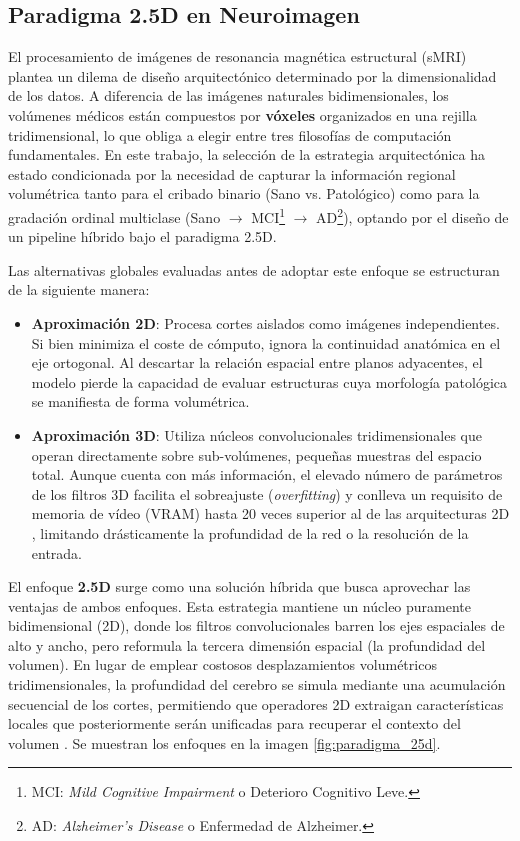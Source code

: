 \documentclass[12pt, oneside, english, spanish]{book}
\begin{document}
\subsection{Paradigma 2.5D en Neuroimagen} \label{subsec:paradigma_25d_teoria}

El procesamiento de imágenes de resonancia magnética estructural (sMRI) plantea un dilema de diseño arquitectónico determinado por la dimensionalidad de los datos. A diferencia de las imágenes naturales bidimensionales, los volúmenes médicos están compuestos por \textbf{vóxeles} organizados en una rejilla tridimensional, lo que obliga a elegir entre tres filosofías de computación fundamentales. En este trabajo, la selección de la estrategia arquitectónica ha estado condicionada por la necesidad de capturar la información regional volumétrica tanto para el cribado binario (Sano vs. Patológico) como para la gradación ordinal multiclase (Sano $\rightarrow$ MCI\footnote{MCI: \textit{Mild Cognitive Impairment} o Deterioro Cognitivo Leve.} $\rightarrow$ AD\footnote{AD: \textit{Alzheimer's Disease} o Enfermedad de Alzheimer.}), optando por el diseño de un pipeline híbrido bajo el paradigma 2.5D.

Las alternativas globales evaluadas antes de adoptar este enfoque se estructuran de la siguiente manera:

\begin{itemize}
	\item \textbf{Aproximación 2D}: Procesa cortes aislados como imágenes independientes. Si bien minimiza el coste de cómputo, ignora la continuidad anatómica en el eje ortogonal. Al descartar la relación espacial entre planos adyacentes, el modelo pierde la capacidad de evaluar estructuras cuya morfología patológica se manifiesta de forma volumétrica.
	
	\item \textbf{Aproximación 3D}: Utiliza núcleos convolucionales tridimensionales que operan directamente sobre sub-volúmenes, pequeñas muestras del espacio total. Aunque cuenta con más información, el elevado número de parámetros de los filtros 3D facilita el sobreajuste (\textit{overfitting}) y conlleva un requisito de memoria de vídeo (VRAM) hasta 20 veces superior al de las arquitecturas 2D \cite{aneja2023}, limitando drásticamente la profundidad de la red o la resolución de la entrada.
\end{itemize}



El enfoque \textbf{2.5D} surge como una solución híbrida que busca aprovechar las ventajas de ambos enfoques. Esta estrategia mantiene un núcleo puramente bidimensional (2D), donde los filtros convolucionales barren los ejes espaciales de alto y ancho, pero reformula la tercera dimensión espacial (la profundidad del volumen). En lugar de emplear costosos desplazamientos volumétricos tridimensionales, la profundidad del cerebro se simula mediante una acumulación secuencial de los cortes, permitiendo que operadores 2D extraigan características locales que posteriormente serán unificadas para recuperar el contexto del volumen \cite{litjens2017deep}. Se muestran los enfoques en la imagen \ref{fig:paradigma_25d}.
\end{document}
